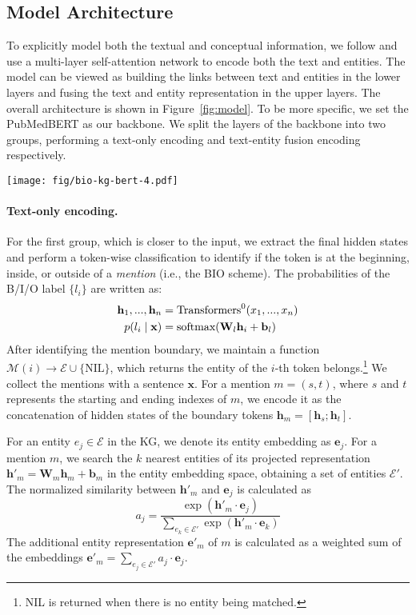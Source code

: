\documentclass[11pt]{article}
\begin{document}
\subsection{Model Architecture}
To explicitly model both the textual and conceptual information,
we follow \citet{fevry-etal-2020-entities} and 
use a multi-layer self-attention network to encode both the text and entities.
The model
can be viewed as
building the links between text and entities
in the lower layers and
fusing the text and entity representation in the upper layers.
The overall architecture is shown in Figure~\ref{fig:model}.
To be more specific,
we set the PubMedBERT \cite{gu2020domain}
as our backbone.
We split the layers of the backbone into two groups,
performing a text-only encoding and text-entity fusion encoding
respectively.

\begin{figure*}[t]
\centering
\texttt{[image: fig/bio-kg-bert-4.pdf]}
\caption{The overall architecture of KeBioLM.}
\label{fig:model}
\end{figure*}


\paragraph{Text-only encoding.}
For the first group, which is closer to the input,
we extract the final hidden states
and perform a token-wise classification
to identify if the token is at the beginning, inside, or outside of a \textit{mention} (i.e., the BIO scheme).
The probabilities of the B/I/O label $\{l_i\}$ are written as:
\begin{align}
    \mathbf{h}_1, ... , \mathbf{h}_n &= {\rm Transformers}^{0}(x_1, ..., x_n) \\
     p(l_i \mid \mathbf{x} ) &= \textrm{softmax}(\mathbf{W}_l \mathbf{h}_i + \mathbf{b}_l)
\end{align}
After identifying the mention boundary,
we maintain a function $\mathcal{M}(i) \rightarrow \mathcal{E} \cup \{\textrm{NIL}\} $,
which returns the entity of the $i$-th token belongs.\footnote{NIL is returned when there is no entity being matched.}
We collect the mentions with a sentence $\mathbf{x}$.
For a mention $m=(s, t)$, where $s$ and $t$ represents the starting and ending indexes
of $m$,
we encode it
as the concatenation of hidden states of the boundary tokens $\mathbf{h}_m = [\mathbf{h}_{s}; \mathbf{h}_{t}]$.

For an entity $e_j \in \mathcal{E}$ in the KG,
we denote its entity embedding as $\mathbf{e}_j$.
For a mention $m$, we search
the $k$ nearest entities
of its projected representation $\mathbf{h}'_m = \mathbf{W}_m \mathbf{h}_m + \mathbf{b}_m$  
in the entity embedding space,
obtaining a set of entities $\mathcal{E}'$.
The normalized similarity between $\mathbf{h}'_m$ and $\mathbf{e}_j$
is calculated as
\begin{equation}
a_j = \frac{\exp(\mathbf{h}'_m \cdot \mathbf{e}_j)}
{\sum_{e_k\in \mathcal{E}'} \exp(\mathbf{h}'_m \cdot \mathbf{e}_k)}
\end{equation}
The additional entity representation $\mathbf{e}'_m$ of $m$
is calculated as a weighted sum
of the embeddings $\mathbf{e}'_m = \sum_{e_j\in \mathcal{E}'} a_j \cdot \mathbf{e}_j$.
\end{document}
